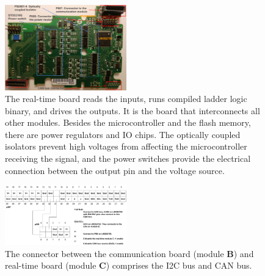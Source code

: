 \begin{figure}[th]
	\includegraphics[width=0.47\textwidth]{figures/board2}
	\centering
	\caption{The real-time board reads the inputs, runs compiled ladder logic binary, and drives the outputs. It is the board that interconnects all other modules. Besides the microcontroller and the flash memory, there are power regulators and IO chips. The optically coupled isolators prevent high voltages from affecting the microcontroller receiving the signal, and the power switches provide the electrical connection between the output pin and the voltage source.}
	\label{fig:board}
\end{figure}


\begin{figure}[th]
	\includegraphics[width=0.47\textwidth]{figures/p607_2}
	\centering
	\caption{The connector between the communication board (module \textbf{B}) and real-time board (module \textbf{C}) comprises the I2C bus and CAN bus. }
	\label{fig:p607}
\end{figure}

%
%
%
%



